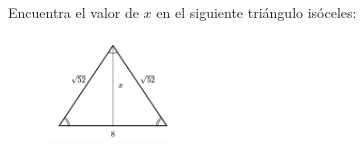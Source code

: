 \question[15] Encuentra el valor de $x$ en el siguiente triángulo isóceles:
\begin{figure}[H]
    \begin{center}
        \includegraphics[width=0.3\textwidth]{../images/pitagoras4.png}
    \end{center}
    \caption{}
    \label{fig:pitagoras4}
\end{figure}